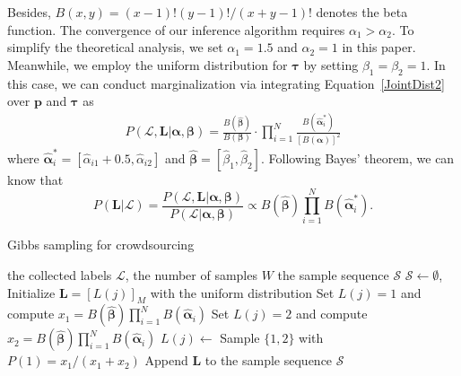 Besides, $B(x,y)=(x-1)!(y-1)!/(x+y-1)!$ denotes the beta function.
The convergence of our inference algorithm requires $\alpha_1>\alpha_2$.
To simplify the theoretical analysis, we set $\alpha_1=1.5$ and $\alpha_2=1$ in this paper.
Meanwhile, we employ the uniform distribution for $\bm{\tau}$ by setting $\beta_1=\beta_2=1$.
In this case, we can conduct marginalization via integrating Equation~\ref{JointDist2} over $\bm{p}$ and $\bm{\tau}$ as
\begin{equation}
\label{marginalization}
\begin{split}
P(\mathcal{L},\bm{L}|\bm{\alpha}, \bm{\beta})=\frac{B(\hat{\bm{\beta}})}{B(\bm{\beta})}\cdot {\prod}_{i=1}^{N}\frac{B(\hat{\bm{\alpha}}^{*}_{i})}{[B(\bm{\alpha})]^2}
\end{split}
\end{equation}
where $\hat{\bm{\alpha}}^{*}_i=[\hat{\alpha}_{i1}+0.5,\hat{\alpha}_{i2}]$ and $\hat{\bm{\beta}}=[\hat{\beta}_1,\hat{\beta}_2]$. Following Bayes' theorem, we can know that
\begin{equation}
\label{PostDist}
P(\bm{L}|\mathcal{L})=\frac{P(\mathcal{L},\bm{L}|\bm{\alpha}, \bm{\beta})}{P(\mathcal{L}|\bm{\alpha}, \bm{\beta})}\propto B(\hat{\bm{\beta}})\prod_{i=1}^{N}B(\hat{\bm{\alpha}}^{*}_{i}). 
\end{equation}


\begin{algorithm}[tb]
   \caption{Gibbs sampling for crowdsourcing}
   \label{GSC}
   \small
\begin{algorithmic}[1]
   \vspace{0.5mm}
    the collected labels $\mathcal{L}$, the number of samples $W$
    the sample sequence $\mathcal{S}$
   \vspace{0.5mm}
   \STATE $\mathcal{S}\leftarrow\emptyset$, Initialize $\bm{L}=[L(j)]_M$ with the uniform distribution
   \STATE Set $L(j)=1$ and compute $x_1= B(\hat{\bm{\beta}})\prod_{i=1}^{N}B(\hat{\bm{\alpha}}_{i})$
   \STATE Set $L(j)=2$ and compute $x_2= B(\hat{\bm{\beta}})\prod_{i=1}^{N}B(\hat{\bm{\alpha}}_{i})$
   \STATE $L(j)\leftarrow$ Sample $\{1,2\}$ with $P(1)=x_1/(x_1+x_2)$
   \ENDFOR
   \STATE Append $\bm{L}$ to the sample sequence $\mathcal{S}$
   \ENDFOR
\end{algorithmic}
\end{algorithm}

